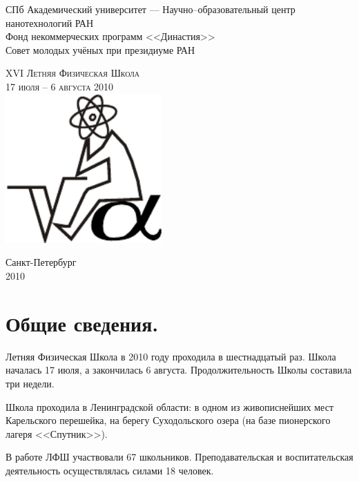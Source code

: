 \documentclass[12pt,a4paper,oneside]{scrartcl}
\newlength{\h}
\newlength{\x}
\begin{document}
\parindent=5mm
\begin{center}
  \small{\textsf{СПб Академический университет ---
      Научно--образовательный центр нанотехнологий РАН\\
    Фонд некоммерческих программ <<Династия>>\\
  Совет молодых учёных при президиуме РАН}}

\vfill
\LARGE{\textsc{XVI Летняя Физическая Школа}}\\
\Large{\textsc{17 июля -- 6 августа 2010}}\\[2cm]
\includegraphics[width=6cm]{logo.pdf}
\vfill

\small{\textsf{Санкт-Петербург}\\
\textsf{2010}}
\end{center}

\clearpage

\hypersetup{colorlinks,%
  linkcolor=black
}

\tableofcontents

\hypersetup{colorlinks,%
  citecolor=blue,
  urlcolor=blue,
  linkcolor=red
}

\clearpage

\section{Общие сведения.}
\label{sec:general}

Летняя Физическая Школа в 2010 году проходила в шестнадцатый
раз. Школа началась 17 июля, а закончилась 6
августа. Продолжительность Школы составила три недели.

Школа проходила в Ленинградской области: в одном из живописнейших мест
Карельского перешейка, на берегу Суходольского озера (на базе
пионерского лагеря <<Спутник>>).

В работе ЛФШ участвовали 67 школьников. Преподавательская и воспитательская
деятельность осуществлялась силами 18 человек.
\end{document}
